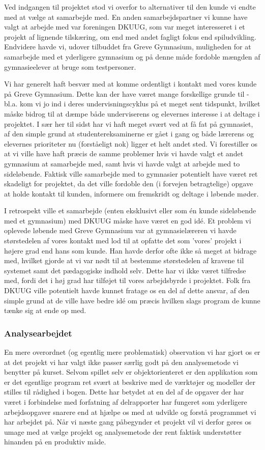 \documentclass[10pt,a4paper,danish]{article}
\begin{document}
Ved indgangen til projektet stod vi overfor to alternativer til den kunde vi endte med
at vælge at samarbejde med. En anden samarbejdspartner vi kunne have valgt at arbejde med
var foreningen DKUUG, som var meget interesseret i et projekt af lignende tilskæring, om end
med andet fagligt fokus end spiludvikling. Endvidere havde vi, udover tilbuddet fra Greve
Gymnasium, muligheden for at samarbejde med et yderligere gymnasium og på denne måde fordoble
mængden af gymnasieelever at bruge som testpersoner. 

Vi har generelt haft besvær med at komme ordentligt i kontakt med vores kunde på Greve Gymnasium. 
Dette kan der have været mange forskellige grunde til - bl.a. kom vi jo ind i deres undervisningscyklus
på et meget sent tidspunkt, hvilket måske bidrog til at dæmpe både underviserens og elevernes 
interesse i at deltage i projektet. I sær her til sidst har vi haft meget svært ved at få fat
på gymnasiet, af den simple grund at studentereksaminerne er gået i gang og både lærerens og
elevernes prioriteter nu (forståeligt nok) ligger et helt andet sted. Vi forestiller os at vi ville
have haft præcis de samme problemer hvis vi havde valgt et andet gymnasium at samarbejde med, samt 
hvis vi havde valgt at arbejde med to sideløbende. Faktisk ville samarbejde med to gymnasier potentielt
have været ret skadeligt for projektet, da det ville fordoble den (i forvejen betragtelige) opgave 
at holde kontakt til kunden, informere om fremskridt og deltage i løbende møder. 

I retrospekt ville et samarbejde (enten eksklusivt eller som én kunde sideløbende med et gymnasium) med 
DKUUG måske have været en god idé. Et problem vi oplevede løbende med Greve Gymnasium var at gymnasielæreren
vi havde størstedelen af vores kontakt med lod til at opfatte det som 'vores' projekt i højere grad end 
hans som kunde. Han havde derfor ofte ikke så meget at bidrage med, hvilket gjorde at vi var nødt til at
bestemme størstedelen af kravene til systemet samt det pædagogiske indhold selv. Dette har vi ikke været tilfredse
med, fordi det i høj grad har tilføjet til vores arbejdsbyrde i projektet. Folk fra DKUUG ville potentielt
havde kunnet fratage os en del af dette ansvar, af den simple grund at de ville have bedre idé om præcis
hvilken slags program de kunne tænke sig at ende op med. 

\subsubsection{Analysearbejdet}
En mere overordnet (og egentlig mere problematisk) observation vi har gjort os er at det projekt vi 
har valgt ikke passer særlig godt på den analysemetode vi benytter på kurset. Selvom spillet selv 
er objektorienteret er den applikation som er det egentlige program ret svært at beskrive med de 
værktøjer og modeller der stilles til rådighed i bogen. Dette har betydet at en del af de opgaver der
har været i forbindelse med forfatning af delrapporter har fungeret som yderligere arbejdsopgaver
snarere end at hjælpe os med at udvikle og forstå programmet vi har arbejdet på. Når vi næste gang
påbegynder et projekt vil vi derfor gøres os umage med at vælge projekt og analysemetode der rent 
faktisk understøtter hinanden på en produktiv måde. 
\end{document}
